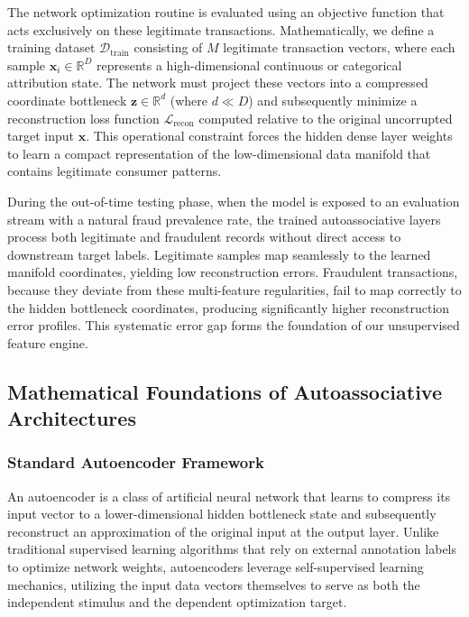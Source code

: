The network optimization routine is evaluated using an objective function that acts exclusively on these legitimate transactions. Mathematically, we define a training dataset $\mathcal{D}_{\text{train}}$ consisting of $M$ legitimate transaction vectors, where each sample $\mathbf{x}_i \in \mathbb{R}^D$ represents a high-dimensional continuous or categorical attribution state. The network must project these vectors into a compressed coordinate bottleneck $\mathbf{z} \in \mathbb{R}^d$ (where $d \ll D$) and subsequently minimize a reconstruction loss function $\mathcal{L}_{\text{recon}}$ computed relative to the original uncorrupted target input $\mathbf{x}$. This operational constraint forces the hidden dense layer weights to learn a compact representation of the low-dimensional data manifold that contains legitimate consumer patterns.

During the out-of-time testing phase, when the model is exposed to an evaluation stream with a natural fraud prevalence rate, the trained autoassociative layers process both legitimate and fraudulent records without direct access to downstream target labels. Legitimate samples map seamlessly to the learned manifold coordinates, yielding low reconstruction errors. Fraudulent transactions, because they deviate from these multi-feature regularities, fail to map correctly to the hidden bottleneck coordinates, producing significantly higher reconstruction error profiles. This systematic error gap forms the foundation of our unsupervised feature engine.

\subsection{Mathematical Foundations of Autoassociative Architectures}

\subsubsection{Standard Autoencoder Framework}

An autoencoder is a class of artificial neural network that learns to compress its input vector to a lower-dimensional hidden bottleneck state and subsequently reconstruct an approximation of the original input at the output layer. Unlike traditional supervised learning algorithms that rely on external annotation labels to optimize network weights, autoencoders leverage self-supervised learning mechanics, utilizing the input data vectors themselves to serve as both the independent stimulus and the dependent optimization target.

